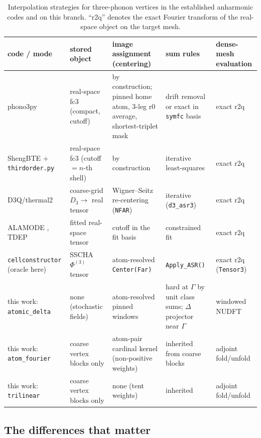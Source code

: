 \documentclass[11pt,a4paper]{article}
\begin{document}
\begin{table}[tb]
\centering
\caption{Interpolation strategies for three-phonon vertices in the
established anharmonic codes and on this branch.  ``r2q'' denotes the
exact Fourier transform of the real-space object on the target mesh.}
\label{tab:codes}
\footnotesize
\setlength{\tabcolsep}{4pt}
\begin{tabular}{p{2.8cm}p{2.5cm}p{3.3cm}p{2.6cm}p{2.9cm}}
\toprule
code / mode & stored object & image assignment (centering) & sum rules &
dense-mesh evaluation \\
\midrule
phono3py \cite{phono3py,phono3py2015} &
real-space fc3 (compact, cutoff) &
by construction; pinned home atom, 3-leg r0 average, shortest-triplet
mask &
drift removal or exact in \texttt{symfc} basis &
exact r2q \\
ShengBTE + \texttt{thirdorder.py} \cite{shengbte} &
real-space fc3 (cutoff $=n$-th shell) &
by construction & iterative least-squares & exact r2q \\
D3Q/thermal2 \cite{d3q,thermal2} &
coarse-grid $D_3 \to$ real tensor &
Wigner--Seitz re-centering (\texttt{NFAR}) & iterative
(\texttt{d3\_asr3}) & exact r2q \\
ALAMODE \cite{alamode}, TDEP \cite{tdep} &
fitted real-space tensor &
cutoff in the fit basis & constrained fit & exact r2q \\
\texttt{cellconstructor} (oracle here) &
SSCHA $\Phi^{(3)}$ tensor &
atom-resolved \texttt{Center(Far)} & \texttt{Apply\_ASR()} &
exact r2q (\texttt{Tensor3}) \\
\midrule
this work: \texttt{atomic\_delta} &
none (stochastic fields) &
atom-resolved pinned windows & hard at $\Gamma$ by unit class sums;
$\Delta$ projector near $\Gamma$ & windowed NUDFT \\
this work: \texttt{atom\_fourier} &
coarse vertex blocks only &
atom-pair cardinal kernel (non-positive weights) & inherited from coarse
blocks & adjoint fold/unfold \\
this work: \texttt{trilinear} &
coarse vertex blocks only &
none (tent weights) & inherited & adjoint fold/unfold \\
\bottomrule
\end{tabular}
\end{table}

\subsection{The differences that matter}
\label{sec:codes-differences}
\end{document}
